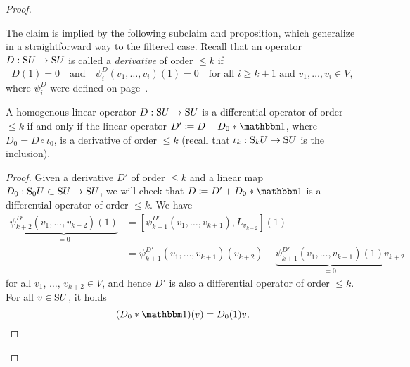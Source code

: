 \documentclass[\MainFolder/Text.tex]{subfiles}
\begin{document}
\begin{proof}
\begin{ProofList}
%
\item The claim is implied by the following subclaim and proposition, which generalize in a straightforward way to the filtered case. Recall that an operator $D: \mathrm{S} U \rightarrow \mathrm{S} U$ is called a \emph{derivative} of order $\le k$ if 
\[ D(1)=0\quad\text{and}\quad\psi_i^D(v_1,\dotsc,v_i)(1)=0\quad\text{for all }i\ge k+1\text{ and }v_1, \dotsc, v_i\in V, \]
where $\psi_i^D$ were defined on page~\pageref{Page:DiffOp}.
\begin{SubClaim}\label{SubClaimFiltr}
A homogenous linear operator $D: \mathrm{S} U \rightarrow \mathrm{S} U$ is a differential operator of order $\le k$ if and only if the linear operator $D' \coloneqq D - D_0\Star \Id$, where $D_0 = D\circ\iota_0$, is a derivative of order $\le k$ (recall that $\iota_k: \mathrm{S}_k U \rightarrow \mathrm{S} U$ is the inclusion).
\end{SubClaim}
\begin{proof}
Given a derivative $D'$ of order $\le k$ and a linear map $D_0: \mathrm{S}_0 U\subset \mathrm{S} U \rightarrow \mathrm{S} U$, we will check that $D\coloneqq D' + D_0\Star \Id$ is a differential operator of order $\le k$. We have
\begin{align*}
 \underbrace{\psi_{k+2}^{D'}(v_1,\dotsc,v_{k+2})(1)}_{=0}&=
 [\psi^{D'}_{k+1}(v_1,\dotsc,v_{k+1}),L_{v_{k+2}}](1)\\
 &=\psi_{k+1}^{D'}(v_1,\dotsc,v_{k+1})(v_{k+2})-\underbrace{\psi_{k+1}^{D'}(v_1,\dotsc,v_{k+1})(1)}_{=0} v_{k+2}
\end{align*}
for all $v_1$, $\dotsc$, $v_{k+2}\in V$, and hence $D'$ is also a differential operator of order $\le k$. For all $v\in \mathrm{S} U$, it holds
\[ (D_0\Star\Id)(v) = D_0(1)v,\]

\end{proof}
\end{ProofList}
\end{proof}
\end{document}
